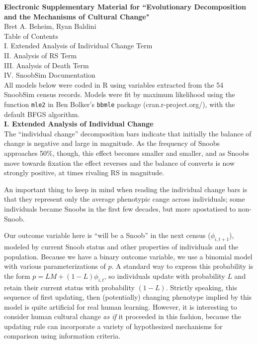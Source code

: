 \documentclass[11pt]{article}
\begin{document}
\textbf{Electronic Supplementary Material for ``Evolutionary Decomposition and the Mechanisms of Cultural Change"}\\
Bret A. Beheim, Ryan Baldini\\

Table of Contents\\
I. Extended Analysis of Individual Change Term\\
II. Analysis of RS Term\\
III. Analysis of Death Term\\
IV. SnoobSim Documentation\\

All models below were coded in R using variables extracted from the 54 SnoobSim census records.  Models were fit by maximum likelihood using the function \texttt{mle2} in Ben Bolker's \texttt{bbmle} package (cran.r-project.org/), with the default BFGS algorithm.\\

\textbf{I. Extended Analysis of Individual Change}\\

The ``individual change'' decomposition bars indicate that initially the balance of change is negative and large in magnitude.  As the frequency of Snoobs approaches 50\%, though, this effect becomes smaller and smaller, and as Snoobs move towards fixation the effect reverses and the balance of converts is now strongly positive, at times rivaling RS in magnitude.

An important thing to keep in mind when reading the individual change bars is that they represent only the average phenotypic cange across individuals; some individuals became Snoobs in the first few decades, but more apostatised to non-Snoob.  

Our outcome variable here is ``will be a Snoob'' in the next census ($\phi_{i,t+1}$), modeled by current Snoob status and other properties of individuals and the population.  Because we have a binary outcome variable, we use a binomial model with various parameterizations of $p$.  A standard way to express this probability is the form $p = LM + (1-L)\phi_{i,t}$, so individuals update with probability $L$ and retain their current status with probability $(1-L)$.  Strictly speaking, this sequence of first updating, then (potentially) changing phenotype implied by this model is quite artificial for real human learning.  However, it is interesting to consider human cultural change \textit{as if} it proceeded in this fashion, because the updating rule can incorporate a variety of hypothesized mechanisms for comparison using information criteria. 
\end{document}
